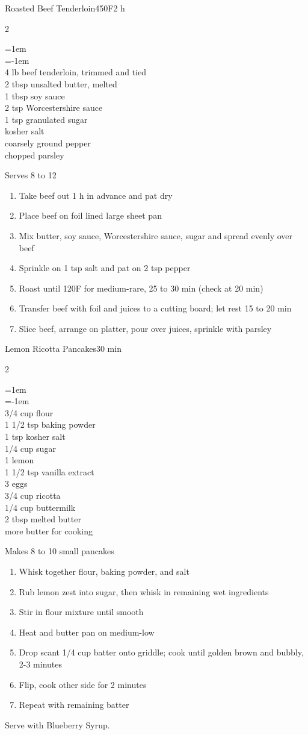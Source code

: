 \documentclass{article}
\newenvironment{recipe}[3][]
    {\begin{cardbase}[#1]{#2}{#3}
    \columnratio{0.333}
    \begin{paracol}{2}}
    {\end{paracol}\end{cardbase}}
\newenvironment{denserecipe}[3][]
    {\small
    \begin{recipe}[#1]{#2}{#3}}
    {\end{recipe}}
\newcommand{\nextcolumn}{\switchcolumn}
\newenvironment{ingredients}
    {
    \begin{obeylines}
    \vspace{\parskip}
    \setlength{\parskip}{0.25em}
    \vspace{-0.25em}
    \leftskip=1em
    \parindent=-1em}
    {\end{obeylines}}
\newenvironment{steps}
    {\begin{enumerate}[leftmargin=*,topsep=0pt]}
    {\end{enumerate}}
\newcommand{\fahrenheit}[1]{#1\textdegree{}F}
\newcommand{\tag}[1]{\hspace{1em}#1}
\newcommand{\symboltag}[2]{\tag{#1\hspace{0.4em}#2}}
\newcommand{\totaltime}[1]{\symboltag{\raisebox{-0.1em}{\small\StopWatchEnd}}{#1}}
\newcommand{\preheat}[1]{\symboltag{\Topbottomheat}{#1}}
\begin{document}
\begin{denserecipe}{Roasted Beef Tenderloin}{\preheat{\fahrenheit{450}}\totaltime{2 h}}
\begin{ingredients}
4 lb beef tenderloin, trimmed and tied
2 tbsp unsalted butter, melted
1 tbsp soy sauce
2 tsp Worcestershire sauce
1 tsp granulated sugar
kosher salt
coarsely ground pepper
chopped parsley
\end{ingredients}
\nextcolumn
Serves 8 to 12
\begin{steps}
\item Take beef out 1 h in advance and pat dry
\item Place beef on foil lined large sheet pan
\item Mix butter, soy sauce, Worcestershire sauce, sugar and spread evenly over beef
\item Sprinkle on 1 tsp salt and pat on 2 tsp pepper
\item Roast until \fahrenheit{120} for medium-rare, 25 to 30 min (check at 20 min)
\item Transfer beef with foil and juices to a cutting board; let rest 15 to 20 min
\item Slice beef, arrange on platter, pour over juices, sprinkle with parsley
\end{steps}
\end{denserecipe}

\begin{denserecipe}{Lemon Ricotta Pancakes}{\totaltime{30 min}}
\begin{ingredients}
3/4 cup flour
1 1/2 tsp baking powder
1 tsp kosher salt
1/4 cup sugar
1 lemon
1 1/2 tsp vanilla extract
3 eggs
3/4 cup ricotta
1/4 cup buttermilk
2 tbsp melted butter
more butter for cooking
\end{ingredients}
\nextcolumn
Makes 8 to 10 small pancakes
\begin{steps}
\item Whisk together flour, baking powder, and salt
\item Rub lemon zest into sugar, then whisk in remaining wet ingredients
\item Stir in flour mixture until smooth
\item Heat and butter pan on medium-low
\item Drop scant 1/4 cup batter onto griddle; cook until golden brown and bubbly, 2-3 minutes
\item Flip, cook other side for 2 minutes
\item Repeat with remaining batter
\end{steps}
Serve with Blueberry Syrup.
\end{denserecipe}
\end{document}
